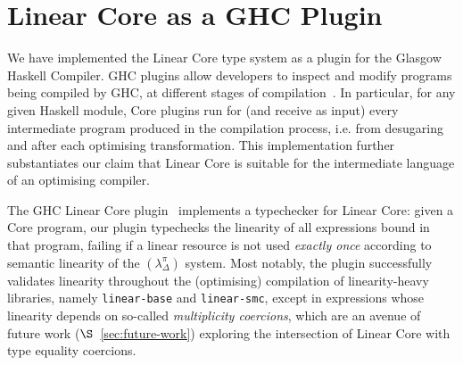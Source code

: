 \documentclass[acmsmall, screen, review]{acmart}
\newcommand{\notyetcolorname}{light yellow}
\begin{document}

\section{Linear Core as a GHC Plugin\label{sec:discuss:implementation}}

We have implemented the Linear Core type system as a plugin for the Glasgow
Haskell Compiler.
GHC plugins allow developers to inspect and modify programs being compiled by
GHC, at different stages of compilation~\cite{10.1145/3331545.3342599}.
%
In particular, for any given Haskell module, Core plugins run for (and receive
as input) every intermediate program produced in the compilation process, i.e.
from desugaring and after each optimising transformation.
%
This implementation further substantiates our claim that Linear Core is
suitable for the intermediate language of an optimising compiler.

The GHC Linear Core plugin~\cite{cite:linear-core-plugin} implements a
typechecker for Linear Core: given a Core program, our plugin typechecks the
linearity of all expressions bound in that program, failing if a linear
resource is not used \emph{exactly once} according to semantic linearity of the
$(\lambda^\pi_\Delta)$ system.
%
Most notably, the plugin successfully validates linearity throughout the
(optimising) compilation of linearity-heavy libraries, namely
\texttt{linear-base} and \texttt{linear-smc}, except in expressions whose
linearity depends on so-called \emph{multiplicity coercions}, which are an
avenue of future work ($\S$~\ref{sec:future-work}) exploring the intersection
of Linear Core with type equality coercions.


\end{document}
